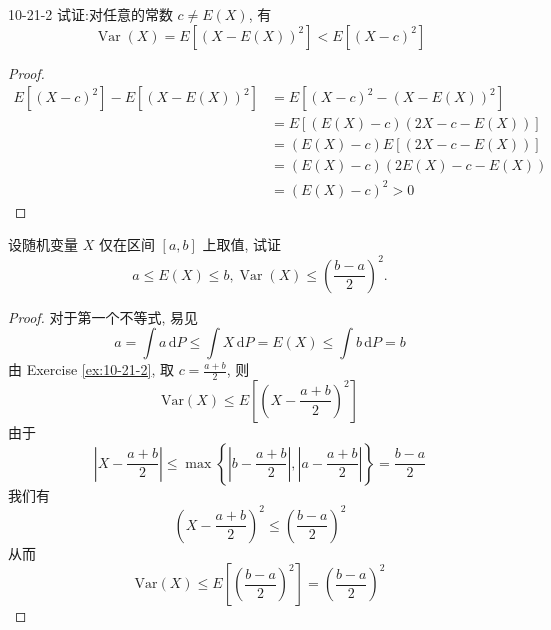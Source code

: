 \documentclass[../main.tex]{subfiles}
\begin{document}
\begin{exercise}{}{10-21-2}
试证:对任意的常数 $c \neq E(X)$, 有
\[
\operatorname{Var}(X) =E[\left( X-E\left( X \right)  \right)^{2} ]< E[\left( X-c \right)^{2}  ]
\]
\end{exercise}
 \begin{proof}
   \[
   \begin{aligned}
   E\left[ \left( X-c \right)^{2}  \right]-E\left[ \left( X-E\left( X \right)  \right)^{2}  \right]&= E\left[ \left( X-c \right)^{2}- \left( X-E\left( X \right)  \right)^{2}   \right]\\ 
    &= E\left[ \left( E\left( X \right)-c  \right)\left( 2X-c-E\left( X \right)  \right)   \right]\\ 
     &= \left( E\left( X \right)-c  \right)E[\left( 2X-c-E\left( X \right)  \right) ]\\ 
      &= \left( E\left( X \right)-c  \right)\left( 2E\left( X \right)-c-E\left( X \right)   \right)\\ 
       &= \left( E\left( X \right)-c  \right)^{2}> 0     
   \end{aligned}
   \]
 \end{proof}
\begin{exercise}{}{}
设随机变量 $X$ 仅在区间 $[a,b]$ 上取值, 试证
\[
a \le E(X) \le b, \operatorname{Var}(X) \le \left(\frac{b-a}{2}\right)^2.
\]
\end{exercise}
\begin{proof}
    对于第一个不等式, 易见 \[
    a= \int a \,\mathrm{d} P\le \int X\,\mathrm{d} P= E\left( X \right)\le \int b\,\mathrm{d} P= b 
    \]
   由 Exercise \ref{ex:10-21-2}, 取 \(  c= \frac{a+ b }{2 }   \), 则   \[
      \mathrm{Var}\left( X \right)\le  E\left[ \left( X-\frac{a+ b }{2 }  \right)^{2}  \right]  
      \] 由于 \[
      \left| X-\frac{a+ b }{2 }  \right|\le \max \left\{ \left| b-\frac{a+ b }{2 }  \right|, \left| a-\frac{a+ b }{2 }  \right|   \right\} = \frac{b-a }{2 } 
      \]我们有 \[
      \left( X-\frac{a+ b }{2 }  \right)^{2}\le \left( \frac{b-a }{ 2}  \right)^{2}  
      \]从而 \[
      \mathrm{Var}\left( X \right)\le E\left[ \left( \frac{b-a }{ 2}  \right)^{2}  \right]= \left( \frac{b-a }{2 }  \right)^{2}   
      \]
\end{proof}
\end{document}
